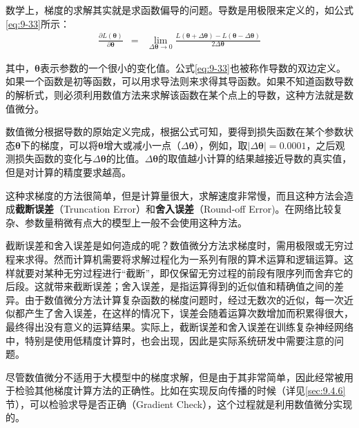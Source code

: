 \parinterval 数学上，梯度的求解其实就是求函数偏导的问题。导数是用极限来定义的，如公式\eqref{eq:9-33}所示：
\begin{eqnarray}
\frac{\partial L({\bm \theta})}{\partial {\bm \theta}}&=&\lim\limits_{\Delta {\bm \theta} \to 0}\frac{L({\bm \theta}+\Delta {\bm \theta})-L({\bm \theta}-\Delta {\bm \theta})}{2\Delta {\bm \theta}}
\label{eq:9-33}
\end{eqnarray}

\noindent 其中，${\bm \theta}$表示参数的一个很小的变化值。公式\eqref{eq:9-33}也被称作导数的双边定义。如果一个函数是初等函数，可以用求导法则来求得其导函数。如果不知道函数导数的解析式，则必须利用数值方法来求解该函数在某个点上的导数，这种方法就是数值微分。

\parinterval 数值微分根据导数的原始定义完成，根据公式可知，要得到损失函数在某个参数状态$ {\bm \theta} $下的梯度，可以将$ {\bm \theta} $增大或减小一点（$ \Delta{\bm \theta}$），例如，取$ \vert{\Delta {\bm \theta}}\vert=0.0001 $，之后观测损失函数的变化与$ \Delta {\bm \theta} $的比值。$ \Delta {\bm \theta}$的取值越小计算的结果越接近导数的真实值，但是对计算的精度要求越高。

\parinterval 这种求梯度的方法很简单，但是计算量很大，求解速度非常慢，而且这种方法会造成{\small\sffamily\bfseries{截断误差}}（Truncation Error）和{\small\sffamily\bfseries{舍入误差}}（Round-off Error)。在网络比较复杂、参数量稍微有点大的模型上一般不会使用这种方法。

\parinterval 截断误差和舍入误差是如何造成的呢？数值微分方法求梯度时，需用极限或无穷过程来求得。然而计算机需要将求解过程化为一系列有限的算术运算和逻辑运算。这样就要对某种无穷过程进行“截断”，即仅保留无穷过程的前段有限序列而舍弃它的后段。这就带来截断误差；舍入误差，是指运算得到的近似值和精确值之间的差异。由于数值微分方法计算复杂函数的梯度问题时，经过无数次的近似，每一次近似都产生了舍入误差，在这样的情况下，误差会随着运算次数增加而积累得很大，最终得出没有意义的运算结果。实际上，截断误差和舍入误差在训练复杂神经网络中，特别是使用低精度计算时，也会出现，因此是实际系统研发中需要注意的问题。

\parinterval 尽管数值微分不适用于大模型中的梯度求解，但是由于其非常简单，因此经常被用于检验其他梯度计算方法的正确性。比如在实现反向传播的时候（详见\ref{sec:9.4.6}节），可以检验求导是否正确（Gradient Check），这个过程就是利用数值微分实现的。\\ \\

%

